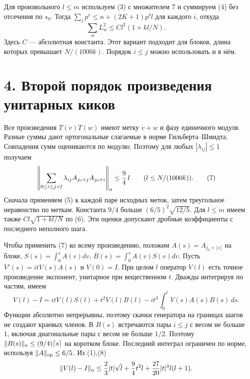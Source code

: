 \documentclass[11pt,a4paper]{article}
\newcommand{\sect}[1]{\section*{\sffamily\color{ink}#1}}
\begin{document}
Для произвольного $l\le m$ используем (3) с множителем 7 и суммируем (4) без отсечения по $s_0$. Тогда $\sum_j p^v\le n+(2K+1)p^\delta l$ для каждого $i$, откуда
\[
                   \sum_w L_w^2 \le C l^2(1+kl/N).                \tag{6}
\]
Здесь $C$ --- абсолютная константа. Этот вариант подходит для блоков, длина которых превышает $N/(1000k)$. Порядок $i\le j$ можно использовать и в нём.
\newpage
\sect{4. Второй порядок произведения унитарных киков}
Все произведения $T(v)T(w)$ имеют метку $v+w$ и фазу единичного модуля. Разные суммы дают ортогональные слагаемые в норме Гильберта--Шмидта. Совпадения сумм оцениваются по модулю. Поэтому для любых $|\lambda_{ij}|\le1$ получаем
\[
   \left\|\sum_{0\le i\le j<l}\lambda_{ij} A_{j_0+j}A_{j_0+i}\right\|_{\rm n}
       \le \frac94\,l\qquad(l\le N/(1000k)).
                                                                     \tag{7}
\]
Сначала применяем (5) к каждой паре исходных меток, затем треугольное неравенство по меткам. Константа $9/4$ больше $(6/5)^2\sqrt{12/5}$. Для $l\le m$ имеем также $C l\sqrt{1+kl/N}$ по (6). Эти оценки допускают дробные коэффициенты с последнего неполного шага.

Чтобы применить (7) ко всему произведению, положим $A(s)=A_{j_0+\lfloor s\rfloor}$ на блоке, $S(s)=\int_0^s A(v)dv$, $B(s)=\int_0^s A(v)S(v)dv$. Пусть $V'(s)=it V(s)A(s)$ и $V(0)=I$. При целом $l$ оператор $V(l)$ есть точное произведение экспонент, унитарное при вещественном $t$. Дважды интегрируя по частям, имеем
\[
 V(l)-I = it V(l)S(l) +t^2 V(l)B(l)
                          -it^3\int_0^l V(s)A(s)B(s)\,ds .         \tag{8}
\]
Функции абсолютно непрерывны, поэтому скачки генератора на границах шагов не создают краевых членов. В $B(s)$ встречаются пары $i\le j$ с весом не больше 1, включая диагональные пары с весом не больше $1/2$. Поэтому $\|B(s)\|_{\rm n}\le(9/4)\lceil s\rceil$ на коротком блоке. Последний интеграл ограничен по норме, используя $\|A\|_{\rm op}\le 6/5$. Из (1),(8)
\[
 \|V(l)-I\|_{\rm n}
       \le \frac23|t|\sqrt l+\frac94 t^2l
                                  +\frac{27}{20}|t|^3l(l+1).
\]
\end{document}
